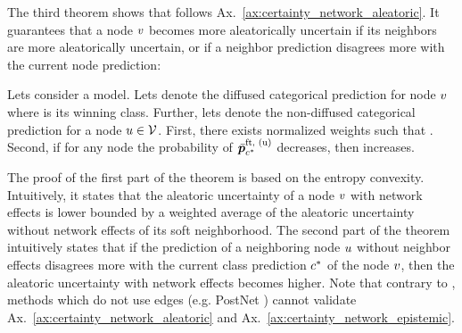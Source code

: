 The third theorem shows that \oursacro{} follows Ax.~\ref{ax:certainty_network_aleatoric}. It guarantees that a node $v$ becomes more aleatorically uncertain if its neighbors are more aleatorically uncertain, or if a neighbor prediction disagrees more with the current node prediction:
\begin{theorem}
\label{thm:axiom-network-aleatoric}
Lets consider a \oursacro{} model. Lets denote  the diffused categorical prediction for node $v$ where \smash{$\iclass^*$} is its winning class. Further, lets denote  the non-diffused categorical prediction for a node $\nodeu \in \vertices$. First, there exists normalized weights  such that . Second, if for any node \smash{$\nodeu \in \vertices$} the probability of $\bar{\bm{p}}_{c^*}^\text{ft, (u)}$ decreases, then  increases.
\end{theorem}
The proof of the first part of the theorem is based on the entropy convexity. Intuitively, it states that the aleatoric uncertainty  of a node $v$ with network effects is lower bounded by a weighted average of the aleatoric uncertainty without network effects of its soft neighborhood. The second part of the theorem intuitively states that if the prediction of a neighboring node $u$ without neighbor effects disagrees more with the current class prediction $\iclass^*$ of the node $v$, then the aleatoric uncertainty  with network effects becomes higher. Note that contrary to \oursacro{}, methods which do not use edges (e.g. PostNet \cite{charpentier2020}) cannot validate Ax.~\ref{ax:certainty_network_aleatoric} and Ax.~\ref{ax:certainty_network_epistemic}.